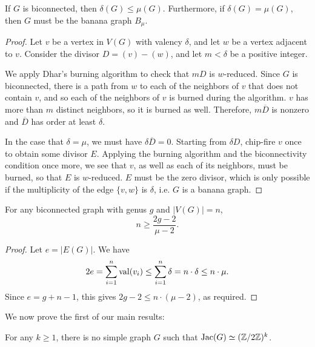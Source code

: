 \documentclass{amsart}
\begin{document}
\begin{lem}
  \label{lem:delta_le_mu}
  If $G$ is biconnected, then $\delta(G) \le \mu(G)$. Furthermore, if
  $\delta(G) = \mu(G)$, then $G$ must be the banana graph $B_\mu$.
\end{lem}
\begin{proof}
  Let $v$ be a vertex in $V(G)$ with valency $\delta$, and let $w$ be
  a vertex adjacent to $v$. Consider the divisor $D = (v) -
  (w)$, and let $m < \delta$ be a positive integer. 

  We apply Dhar's burning algorithm to check that $mD$ is
  $w$-reduced. Since $G$ is biconnected, there is a path from $w$ to
  each of the neighbors of $v$ that does not contain $v$, and so each
  of the neighbors of $v$ is burned during the algorithm. $v$ has more
  than $m$ distinct neighbors, so it is burned as well. Therefore,
  $m\overline{D}$ is nonzero and $\overline{D}$ has order at least
  $\delta$.

  In the case that $\delta = \mu$, we must have $\delta\overline{D} =
  0$. Starting from $\delta D$, chip-fire $v$ once to obtain some
  divisor $E$. Applying the burning algorithm and the biconnectivity
  condition once more, we see that $v$, as well as each of its
  neighbors, must be burned, so that $E$ is $w$-reduced. $E$ must be
  the zero divisor, which is only possible if the multiplicity of the
  edge $\{v,w\}$ is $\delta$, i.e. $G$ is a banana graph.
\end{proof}

\begin{cor}
  \label{cor:genus_v_mu}
  For any biconnected graph with genus $g$ and $|V(G)| = n$,
  \begin{equation*}
    n \ge \frac{2g - 2}{\mu - 2}.
  \end{equation*}
\end{cor}
\begin{proof}
  Let $e = |E(G)|$. We have 
  \begin{equation*}
    2e = \sum_{i=1}^n \operatorname{val}(v_i) \le \sum_{i=1}^n \delta = n \cdot \delta
    \le n \cdot \mu.
  \end{equation*}
  Since $e = g + n - 1$, this gives $2g - 2 \le n \cdot (\mu - 2)$, as
  required.
\end{proof}

We now prove the first of our main results:

\begin{thm}
  \label{thm:2group}
  For any $k \ge 1$, there is no simple graph $G$ such that $\operatorname{Jac}(G)
  \simeq (\mathbb{Z}/2\mathbb{Z})^k$.
\end{thm}
\end{document}
